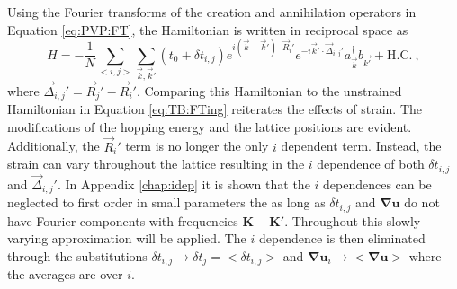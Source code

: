 Using the Fourier transforms of the creation and annihilation operators in Equation \ref{eq:PVP:FT}, the Hamiltonian is written in reciprocal space as 
\begin{equation}
  H=-\frac{1}{N} \sum_{<i,j>} \sum_{\vec{k},\vec{k}'} \left( t_0+\delta t_{i,j} \right)
    e^{i(\vec{k}-\vec{k}')\cdot \vec{R}_i'}
    e^{-i\vec{k}'\cdot \vec{\Delta}_{i,j}'}
    a_{\vec{k}}^{\dagger} b_{\vec{k'}} +\text{H.C.}\ ,
    \label{eq:TB:beforeSV}
\end{equation}
where $\vec{\Delta}_{i,j}'=\vec{R}_j'-\vec{R}_i'$.
Comparing this Hamiltonian to the unstrained Hamiltonian in Equation \ref{eq:TB:FTing} reiterates the effects of strain.
The modifications of the hopping energy and the lattice positions are evident.
Additionally, the $\vec{R}_i'$ term is no longer the only $i$ dependent term.
Instead, the strain can vary throughout the lattice resulting in the $i$ dependence of both $\delta t_{i,j}$ and $\vec{\Delta}_{i,j}'$.
In Appendix \ref{chap:idep} it is shown that the $i$ dependences can be neglected to first order in small parameters the as long as $\delta t_{i,j}$ and $\bm{\nabla u}$ do not have Fourier components with frequencies $\bm{K}-\bm{K'}$.
Throughout this slowly varying approximation will be applied.
The $i$ dependence is then eliminated through the substitutions $\delta t_{i,j} \rightarrow \delta t_j=<\delta t_{i,j}>$ and $\bm{\nabla u}_i \rightarrow <\bm{\nabla u}>$ where the averages are over $i$. 

